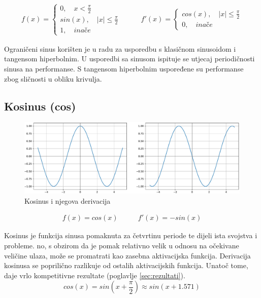 \documentclass[times, utf8, numeric, diplomski]{fer}
\def\otherwise{\textit{inače}}
\def\secref#1{(poglavlje \ref{#1})}
\begin{document}
\begin{equation}
\label{eq:trsin}
\begin{split}
f(x) =
\begin{cases}
0, \quad x < \frac{\pi}{2} \\
sin(x), \quad |x| \leq \frac{\pi}{2} \\
1, \quad \otherwise
\end{cases}
\end{split}
\qquad
\begin{split}
f'(x) =
\begin{cases}
cos(x), \quad |x| \leq \frac{\pi}{2} \\
0, \quad \otherwise
\end{cases}
\end{split}
\end{equation}

Ograničeni sinus korišten je u radu \citet{taming_waves} za usporedbu s klasičnom sinusoidom i tangensom hiperbolnim. U usporedbi sa sinusom ispituje se utjecaj periodičnosti sinusa na performanse. S tangensom hiperbolnim uspoređene su performanse zbog sličnosti u obliku krivulja.

\subsection{Kosinus (cos)}

\begin{figure}[H]
\includegraphics[width=\textwidth]{Cos.pdf}
\centering
\caption{Kosinus i njegova derivacija}
\label{fig:cos}
\end{figure}

\begin{equation}
\label{eq:cos}
\begin{split}
f(x) = cos(x)
\end{split}
\qquad
\begin{split}
f'(x) = -sin(x)
\end{split}
\end{equation}

Kosinus je funkcija sinusa pomaknuta za četvrtinu periode te dijeli ista svojstva i probleme. no, s obzirom da je pomak relativno velik u odnosu na očekivane veličine ulaza, može se promatrati kao zasebna aktivacijska funkcija. Derivacija kosinusa se poprilično razlikuje od ostalih aktivacijskih funkcija. Unatoč tome, daje vrlo kompetitivne rezultate \secref{sec:rezultati}.
\begin{equation}
cos(x) = sin(x + \frac{\pi}{2}) \approx sin(x + 1.571)
\end{equation}
\end{document}
